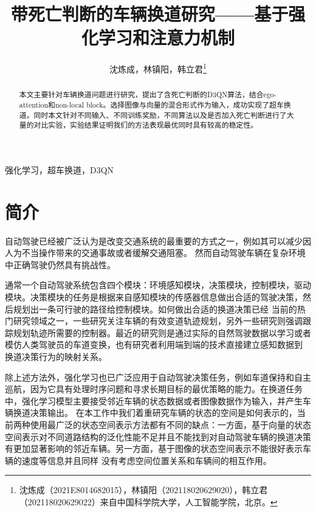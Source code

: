 \documentclass[letterpaper, 10 pt, conference]{ieeeconf}  %
\title{\LARGE \bf
带死亡判断的车辆换道研究——基于强化学习和注意力机制
}
\author{沈炼成，林镇阳，韩立君\thanks{沈炼成（2021E8014682015），林镇阳（202118020629020），韩立君（202118020629022）来自中国科学院大学，人工智能学院，北京。    } }%
\begin{document}
\maketitle
\thispagestyle{empty}
\pagestyle{empty}


\begin{abstract}
本文主要针对车辆换道问题进行研究，提出了含死亡判断的D3QN算法，结合ego-attention和non-local block。选择图像与向量的混合形式作为输入，成功实现了超车换道。同时本文针对不同输入、不同训练奖励，不同算法以及是否加入死亡判断进行了大量的对比实验，实验结果证明我们的方法表现最优同时具有较高的稳定性。

\end{abstract}

\begin{keywords}
    强化学习，超车换道，D3QN
\end{keywords}

\section{简介}

自动驾驶已经被广泛认为是改变交通系统的最重要的方式之一，例如其可以减少因人为不当操作带来的交通事故或者缓解交通阻塞\cite{FAGNANT2015167}。
然而自动驾驶车辆在复杂环境中正确驾驶仍然具有挑战性。

通常一个自动驾驶系统包含四个模块：环境感知模块，决策模块，控制模块，驱动模块\cite{li2018reinforcement}。决策模块的任务是根据来自感知模块的传感器信息做出合适的驾驶决策，然后规划出一条可行驶的路径给控制模块。如何做出合适的换道决策已经
当前的热门研究领域之一，一些研究关注车辆的有效变道轨迹规划\cite{xu2012dynamic,yang2018dynamic}，另外一些研究则强调跟踪规划轨迹所需要的控制器\cite{cesari2017scenario,suh2018stochastic}。最近的研究则是通过实际的自然驾驶数据以学习或者模仿人类驾驶员的车道变换\cite{wang2014investigation,li2017retrieving,xu2018naturalistic}，也有研究者利用端到端的技术直接建立感知数据到
换道决策行为的映射关系\cite{jeong2017end}。

除上述方法外，强化学习也已广泛应用于自动驾驶决策任务，例如车道保持\cite{oh2000new,sallab2016end}和自主巡航\cite{desjardins2011cooperative}，因为它具有处理时序问题和寻求长期目标的最优策略的能力。在换道任务中，强化学习模型主要接受邻近车辆的状态数据或者图像数据作为输入\cite{li2019reinforcement,wang2019lane}，并产生车辆换道决策输出。
在本工作中我们着重研究车辆的状态的空间是如何表示的，当前两种使用最广泛的状态空间表示方法都有不同的缺点：一方面，基于向量的状态空间表示对不同道路结构的泛化性能不足并且不能找到对自动驾驶车辆的换道决策有更加显著影响的邻近车辆。另一方面，基于图像的状态空间表示不能很好表示车辆的速度等信息并且同样
没有考虑空间位置关系和车辆间的相互作用。
\end{document}
